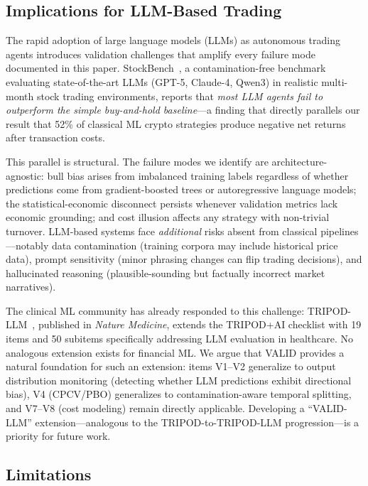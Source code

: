 \documentclass[sigconf,anonymous,review]{acmart}
\begin{document}
\subsection{Implications for LLM-Based Trading}

The rapid adoption of large language models (LLMs) as autonomous
trading agents introduces validation challenges that amplify every
failure mode documented in this paper.
StockBench~\cite{chen2025stockbench}, a contamination-free benchmark
evaluating state-of-the-art LLMs (GPT-5, Claude-4, Qwen3) in
realistic multi-month stock trading environments, reports that
\emph{most LLM agents fail to outperform the simple buy-and-hold
baseline}---a finding that directly parallels our result that 52\% of
classical ML crypto strategies produce negative net returns after
transaction costs.

This parallel is structural. The failure modes we identify
are architecture-agnostic: bull bias arises from imbalanced training
labels regardless of whether predictions come from gradient-boosted
trees or autoregressive language models; the statistical-economic
disconnect persists whenever validation metrics lack economic
grounding; and cost illusion affects any strategy with non-trivial
turnover. LLM-based systems face \emph{additional} risks absent from
classical pipelines---notably data contamination (training corpora may
include historical price data), prompt sensitivity (minor phrasing
changes can flip trading decisions), and hallucinated reasoning
(plausible-sounding but factually incorrect market narratives).

The clinical ML community has already responded to this challenge:
TRIPOD-LLM~\cite{gallifant2025tripodllm}, published in \emph{Nature
Medicine}, extends the TRIPOD+AI checklist with 19 items and 50
subitems specifically addressing LLM evaluation in healthcare.
No analogous extension exists for financial ML.
We argue that VALID provides a natural foundation for such an
extension: items V1--V2 generalize to output distribution monitoring
(detecting whether LLM predictions exhibit directional bias),
V4 (CPCV/PBO) generalizes to contamination-aware temporal
splitting, and V7--V8 (cost modeling) remain directly applicable.
Developing a ``VALID-LLM'' extension---analogous to the
TRIPOD-to-TRIPOD-LLM progression---is a priority for future work.

\subsection{Limitations}
\end{document}
